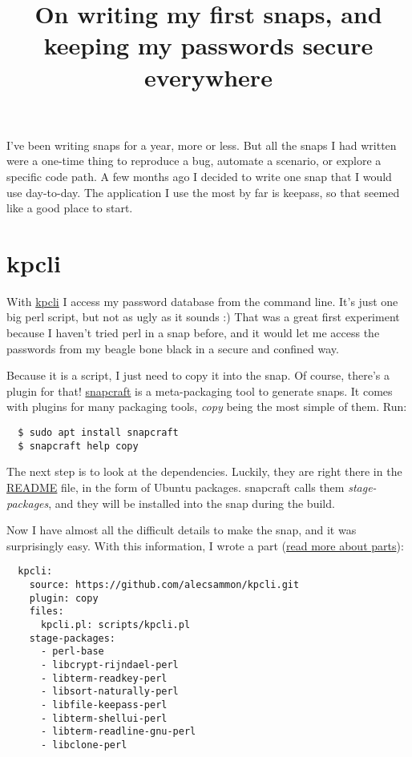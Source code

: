\documentclass[12pt]{article}
\title{
  On writing my first snaps, and keeping my passwords secure everywhere}
\begin{document}
I've been writing snaps for a year, more or less. But all the snaps I had
written were a one-time thing to reproduce a bug, automate a scenario, or
explore a specific code path. A few months ago I decided to write one snap
that I would use
day-to-day. The application I use the most by far is keepass, so that seemed
like a good place to start.

\section{kpcli}

With \href{https://github.com/alecsammon/kpcli}{kpcli} I access my password
database from the command line. It's just one big perl script, but not as ugly
as it sounds :) That was a great first experiment because I haven't tried perl
in a snap before, and it would let me access the passwords from my beagle
bone black in a secure and confined way.

Because it is a script, I just need to copy it into the snap. Of course,
there's a plugin for that! \href{http://snapcraft.io/}{snapcraft} is a
meta-packaging tool to generate snaps. It comes with plugins for many
packaging tools, \emph{copy} being the most simple of them. Run:

\begin{verbatim}
  $ sudo apt install snapcraft
  $ snapcraft help copy
\end{verbatim}

The next step is to look at the dependencies. Luckily, they are right there in
the \href{https://github.com/alecsammon/kpcli/blob/master/README.md}{README}
file, in the form of Ubuntu packages. snapcraft calls them
\emph{stage-packages}, and they will be installed into the snap during the
build.

Now I have almost all the difficult details to make the snap, and it was
surprisingly easy. With this information, I wrote a part
(\href{http://snapcraft.io/create/#parts-intro}{read more about parts}):

\begin{verbatim}
  kpcli:
    source: https://github.com/alecsammon/kpcli.git
    plugin: copy
    files:
      kpcli.pl: scripts/kpcli.pl
    stage-packages:
      - perl-base
      - libcrypt-rijndael-perl
      - libterm-readkey-perl
      - libsort-naturally-perl
      - libfile-keepass-perl
      - libterm-shellui-perl
      - libterm-readline-gnu-perl
      - libclone-perl
\end{verbatim}
\end{document}
